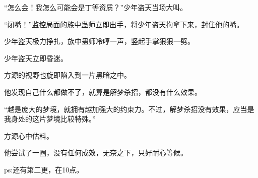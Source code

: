 \begin{this_body}
“怎么会！我怎么可能会是丁等资质？”少年盗天当场大叫。

“闭嘴！”监控局面的族中蛊师立即出手，将少年盗天拘拿下来，封住他的嘴。

少年盗天极力挣扎，族中蛊师冷哼一声，竖起手掌狠狠一劈。

少年盗天立即昏迷。

方源的视野也旋即陷入到一片黑暗之中。

他发现自己什么都做不了，就算是解梦杀招，都没有什么效果。

“越是庞大的梦境，就拥有越加强大的约束力。不过，解梦杀招没有效果，应当是我身处的这片梦境比较特殊。”

方源心中估料。

他尝试了一圈，没有任何成效，无奈之下，只好耐心等候。

ps:还有第二更，在10点。

\end{this_body}

